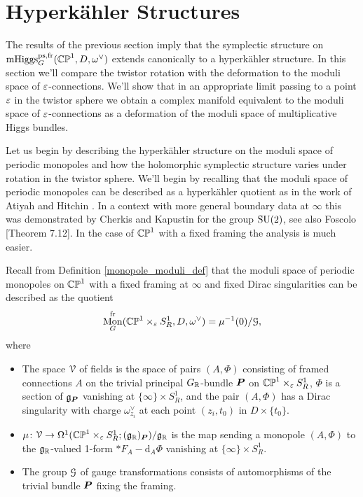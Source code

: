 \documentclass[10pt, oneside]{article}
\DeclareMathOperator{\mhiggs}{mHiggs}
\DeclareMathOperator{\mon}{Mon}
\renewcommand{\d}{\mathrm{d}}
\newcommand{\fr}{\mathrm{fr}}
\begin{document}
\section{Hyperk\"ahler Structures} \label{hyperkahler_section}
The results of the previous section imply that the symplectic structure on $\mhiggs_G^{\text{ps,fr}}(\bb{CP}^1,D,\omega^\vee)$ extends canonically to a hyperk\"ahler structure.  In this section we'll compare the twistor rotation with the deformation to the moduli space of $\varepsilon$-connections. We'll show that in an appropriate limit passing to a point $\varepsilon$ in the twistor sphere we obtain a complex manifold equivalent to the moduli space of $\varepsilon$-connections as a deformation of the moduli space of multiplicative Higgs bundles.

Let us begin by describing the hyperk\"ahler structure on the moduli space of periodic monopoles and how the holomorphic symplectic structure varies under rotation in the twistor sphere.  We'll begin by recalling that the moduli space of periodic monopoles can be described as a hyperk\"ahler quotient as in the work of Atiyah and Hitchin \cite{AtiyahHitchin}.  In a context with more general boundary data at $\infty$ this was demonstrated by Cherkis and Kapustin \cite{CherkisKapustin3} for the group $\mathrm{SU}(2)$, see also Foscolo \cite{FoscoloDef}[Theorem 7.12].  In the case of $\mathbb{CP}^1$ with a fixed framing the analysis is much easier.

Recall from Definition \ref{monopole_moduli_def} that the moduli space of periodic monopoles on $\mathbb{CP}^1$ with a fixed framing at $\infty$ and fixed Dirac singularities can be described as the quotient 
\[\mon_G^{\fr}(\bb{CP}^1 \times_\eps S^1_R, D, \omega^\vee) = \mu^{-1}(0)/\mc G,\]
where 
\vspace{-10pt}
\begin{itemize}
\item The space $\mathcal{V}$ of fields is the space of pairs $(A,\Phi)$ consisting of framed connections $A$ on the trivial principal $G_{\mathbb{R}}$-bundle $\boldsymbol{P}$ on $\mathbb{CP}^1 \times_\varepsilon S^1_R$, $\Phi$ is a section of $\mathfrak{g}_{\boldsymbol{P}}$ vanishing at $\{\infty\} \times S^1_R$, and the pair $(A,\Phi)$ has a Dirac singularity with charge $\omega^\vee_{z_i}$ at each point $(z_i,t_0)$ in $D \times \{t_0\}$.
\item $\mu \colon \mathcal{V} \to \Omega^1(\mathbb{CP}^1 \times_\varepsilon S^1_R; (\mathfrak{g}_{\mathbb{R}})_{\boldsymbol{P}})/\mathfrak{g}_{\mathbb{R}}$ is the map sending a monopole $(A, \Phi)$ to the $\mathfrak{g}_{\mathbb{R}}$-valued 1-form $\ast F_A - \d_A \Phi$ vanishing at $\{\infty\} \times S^1_R$.  
\item The group $\mathcal{G}$ of gauge transformations consists of automorphisms of the trivial bundle $\boldsymbol{P}$ fixing the framing.
\end{itemize}
\end{document}
